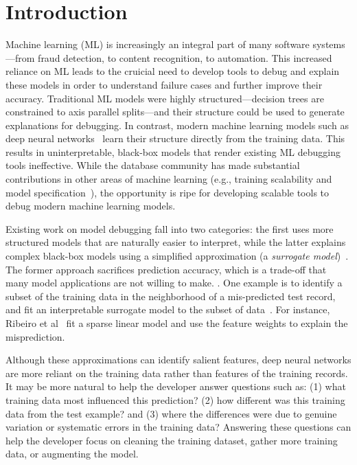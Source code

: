 \section{Introduction}\label{intro}
Machine learning (ML) is increasingly an integral part of many software systems---from fraud detection, to content recognition, to automation.
This increased reliance on ML leads to the cruicial need to develop tools to debug and explain these models in order to understand failure cases and further improve their accuracy.
Traditional ML models were highly structured---decision trees are constrained to axis parallel splits---and their structure could be used to generate explanations for debugging.
In contrast, modern machine learning models such as deep neural networks~\cite{} learn their structure directly from the training data.
This results in uninterpretable, black-box models that render existing ML debugging tools ineffective.
While the database community has made substantial contributions in other areas of machine learning (e.g., training scalability and model specification~\cite{hellerstein2012madlib,tensor,kraska2013mlbase,crotty2014tupleware,keystone}), the opportunity is ripe for developing scalable tools to debug modern machine learning models.

Existing work on model debugging fall into two categories:
the first uses more structured models that are naturally easier to interpret, while the latter explains complex black-box models using a simplified approximation (a {\it surrogate model})~\cite{
taylor2016alignment, lei2016rationalizing, ribeiro2016should}. 
The former approach sacrifices prediction accuracy, which is a trade-off that many model applications are not willing to make.
.
One example is to identify a subset of the training data in the neighborhood of a mis-predicted test record, and fit an interpretable surrogate model to the subset of data~\cite{taylor2016alignment, lei2016rationalizing, ribeiro2016should}.
For instance, Ribeiro et al~\cite{ribeiro2016should} fit a sparse linear model and use the feature weights to explain the misprediction.

Although these approximations can identify salient features, deep neural networks are more reliant on the training data rather than features of the training records.
It may be more natural to help the developer answer questions such as:
  (1) what training data most influenced this prediction? (2) how different was this training data from the test example? and (3) where the differences were due to genuine variation or systematic errors in the training data?
Answering these questions can help the developer focus on cleaning the training dataset, gather more training data, or augmenting the model.


